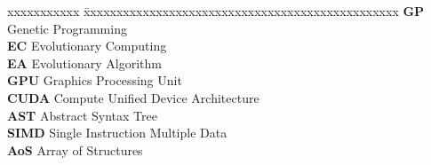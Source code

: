 \abbreviations
 
\noindent 
\begin{tabbing}
xxxxxxxxxxx \= xxxxxxxxxxxxxxxxxxxxxxxxxxxxxxxxxxxxxxxxxxxxxxxx \kill
\textbf{GP}     \> Genetic Programming \\
\textbf{EC}     \> Evolutionary Computing \\
\textbf{EA}     \> Evolutionary Algorithm \\
\textbf{GPU}    \> Graphics Processing Unit \\
\textbf{CUDA}   \> Compute Unified Device Architecture \\
\textbf{AST}    \> Abstract Syntax Tree \\
\textbf{SIMD} \> Single Instruction Multiple Data \\
\textbf{AoS} \> Array of Structures \\
\end{tabbing}

